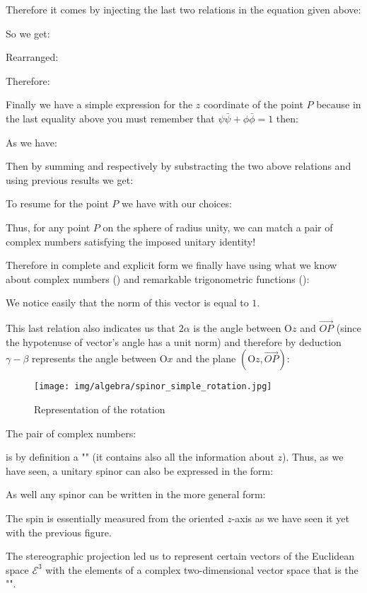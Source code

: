 	Therefore it comes by injecting the last two relations in the equation given above:
	
	So we get:
	
	Rearranged:
	
	Therefore:
	
	Finally we have a simple expression for the $z$ coordinate of the point $P$ because in the last equality above you must remember that $\psi\bar{\psi}+\phi\bar{\phi}=1$ then:
	
	As we have:
	
	Then by summing and respectively by substracting the two above relations and using previous results we get:
	
	To resume for the point $P$ we have with our choices:
	
	Thus, for any point $P$ on the sphere of radius unity, we can match a pair of complex numbers satisfying the imposed unitary identity!
	
	\pagebreak
	Therefore in complete and explicit form we finally have using what we know about complex numbers () and remarkable trigonometric functions ():
	
	We notice easily that the norm of this vector is equal to $1$.
	
	This last relation also indicates us that $2\alpha$ is the angle between $\text{O}z$ and $\overrightarrow{OP}$ (since the hypotenuse of vector's angle has a unit norm) and therefore by deduction $\gamma-\beta$ represents the angle between $\text{O}x$ and the plane $(\text{O}z, \overrightarrow{OP})$:
	
	\begin{figure}[H]
		\centering
		\texttt{[image: img/algebra/spinor\_simple\_rotation.jpg]}
		\caption[]{Representation of the rotation}
	\end{figure}

	The pair of complex numbers:

	

	is by definition a "" (it contains also all the information about $z$). Thus, as we have seen, a unitary spinor can also be expressed in the form:
	
	As well any spinor can be written in the more general form:
	
	The spin is essentially measured from the oriented $z$-axis as we have seen it yet with the previous figure.
	
	The stereographic projection led us to represent certain vectors of the Euclidean space $\mathcal{E}^3$ with the elements of a complex two-dimensional vector space that is the "".
	
